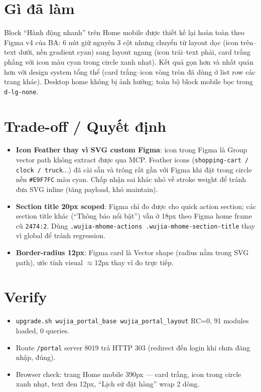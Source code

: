 \section{Gì đã làm}

Block ``Hành động nhanh'' trên Home mobile được thiết kế lại hoàn toàn theo Figma v4 của BA: 6 nút giữ nguyên 3 cột nhưng chuyển từ layout dọc (icon trên--text dưới, nền gradient cyan) sang layout ngang (icon trái--text phải, card trắng phẳng với icon màu cyan trong circle xanh nhạt). Kết quả gọn hơn và nhất quán hơn với design system tổng thể (card trắng--icon vòng tròn đã dùng ở list row các trang khác). Desktop home không bị ảnh hưởng; toàn bộ block mobile bọc trong \texttt{d-lg-none}.

\section{Trade-off / Quyết định}

\begin{itemize}
  \item \textbf{Icon Feather thay vì SVG custom Figma}: icon trong Figma là Group vector path không extract được qua MCP. Feather icons (\texttt{shopping-cart / clock / truck}...) đã cài sẵn và trông rất gần với Figma khi đặt trong circle nền \texttt{\#E9F7FC} màu cyan. Chấp nhận sai khác nhỏ về stroke weight để tránh đưa SVG inline (tăng payload, khó maintain).
  \item \textbf{Section title 20px scoped}: Figma chỉ đo được cho quick action section; các section title khác (``Thông báo nổi bật'') vẫn ở 18px theo Figma home frame cũ \texttt{2474:2}. Dùng \texttt{.wujia-mhome-actions .wujia-mhome-section-title} thay vì global để tránh regression.
  \item \textbf{Border-radius 12px}: Figma card là Vector shape (radius nằm trong SVG path), ước tính visual $\approx$12px thay vì đo trực tiếp.
\end{itemize}

\section{Verify}

\begin{itemize}
  \item \texttt{upgrade.sh wujia\_portal\_base wujia\_portal\_layout} RC=0, 91 modules loaded, 0 queries.
  \item Route \texttt{/portal} server 8019 trả HTTP 303 (redirect đến login khi chưa đăng nhập, đúng).
  \item Browser check: trang Home mobile 390px --- card trắng, icon trong circle xanh nhạt, text đen 12px, ``Lịch sử đặt hàng'' wrap 2 dòng.
\end{itemize}

